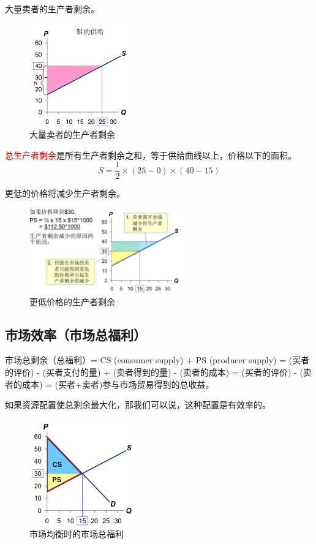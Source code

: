\documentclass[12pt, a4paper]{article}
\begin{document}
大量卖者的生产者剩余。

\begin{figure}[H]
  \centering
  \includegraphics[width=0.4\textwidth]{大量卖者的生产者剩余.png}
  \caption{大量卖者的生产者剩余}
\end{figure}

\textcolor{red}{总生产者剩余}是所有生产者剩余之和，等于供给曲线以上，价格以下的面积。
\[
S = \frac{1}{2} \times (25 - 0) \times (40 - 15)
\]

更低的价格将减少生产者剩余。

\begin{figure}[H]
  \centering
  \includegraphics[width=0.6\textwidth]{更低价格的生产者剩余.png}
  \caption{更低价格的生产者剩余}
\end{figure}

\subsection{市场效率（市场总福利）}
市场总剩余（总福利）= CS (consumer supply) +  PS (producer supply) 
= (买者的评价) - (买者支付的量) + (卖者得到的量) - (卖者的成本) 
= (买者的评价) - (卖者的成本) 
= (买者+卖者)参与市场贸易得到的总收益。

如果资源配置使总剩余最大化，那我们可以说，这种配置是有效率的。

\begin{figure}[H]
  \centering
  \includegraphics[width=0.4\textwidth]{市场总福利.png}
  \caption{市场均衡时的市场总福利}
\end{figure}
\end{document}
